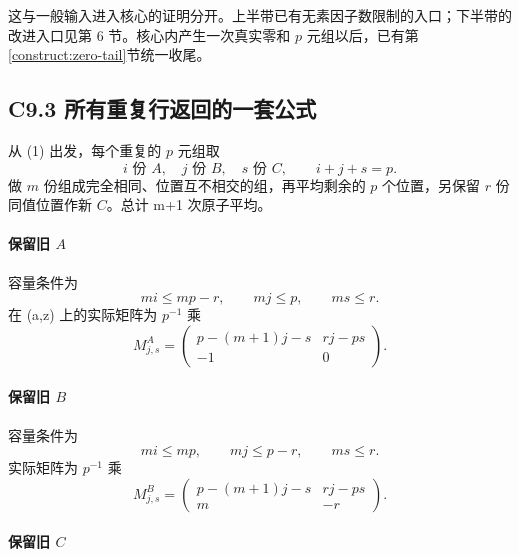 \documentclass[11pt,a4paper]{article}
\theoremstyle{definition}
\numberwithin{equation}{section}
\begin{document}
{这与一般输入进入核心的证明分开。上半带已有无素因子数限制的入口；下半带的改进入口见第} {6} {节。核心内产生一次真实零和} {\ensuremath{p}} {元组以后，已有}第\ref{construct:zero-tail}节{统一收尾。}

\subsection*{\texorpdfstring{{C9.3} {所有重复行返回的一套公式}}{C9.3 所有重复行返回的一套公式}}\label{C9-h60}

{从} {(1)} {出发，每个重复的} {\ensuremath{p}} {元组取} \[
i\text{ 份 }A,\quad j\text{ 份 }B,\quad s\text{ 份 }C,
\qquad i+j+s=p.
\] {做} {\ensuremath{m}} {份组成完全相同、位置互不相交的组，再平均剩余的} {\ensuremath{p}} {个位置，另保留} {\ensuremath{r}} {份同值位置作新} {\ensuremath{C}。总计} {m+1} {次原子平均。}

\paragraph*{\texorpdfstring{{保留旧} {\ensuremath{A}}}{保留旧 }}\label{C9-h61}

{容量条件为} \[
mi\le mp-r,\qquad mj\le p,\qquad ms\le r.
\] {在} {(a,z)} {上的实际矩阵为} {\ensuremath{p^{-1}}} {乘} \[
\boxed{M^A_{j,s}=
\begin{pmatrix}
p-(m+1)j-s&rj-ps\\
-1&0
\end{pmatrix}.}
\tag{C9.5}
\]

\paragraph*{\texorpdfstring{{保留旧} {\ensuremath{B}}}{保留旧 }}\label{C9-h62}

{容量条件为} \[
mi\le mp,\qquad mj\le p-r,\qquad ms\le r.
\] {实际矩阵为} {\ensuremath{p^{-1}}} {乘} \[
\boxed{M^B_{j,s}=
\begin{pmatrix}
p-(m+1)j-s&rj-ps\\
m&-r
\end{pmatrix}.}
\tag{C9.6}
\]

\paragraph*{\texorpdfstring{{保留旧} {\ensuremath{C}}}{保留旧 }}\label{C9-h63}
\end{document}
